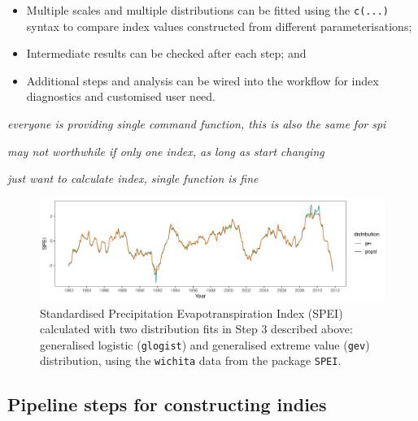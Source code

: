 \documentclass[
]{article}
\providecommand{\tightlist}{%
  \setlength{\itemsep}{0pt}\setlength{\parskip}{0pt}}\usepackage{longtable,booktabs,array}
\begin{document}
\begin{itemize}
\tightlist
\item
  Multiple scales and multiple distributions can be fitted using the
  \texttt{c(...)} syntax to compare index values constructed from
  different parameterisations;
\item
  Intermediate results can be checked after each step; and
\item
  Additional steps and analysis can be wired into the workflow for index
  diagnostics and customised user need.
\end{itemize}

\emph{everyone is providing single command function, this is also the
same for spi}

\emph{may not worthwhile if only one index, as long as start changing}

\emph{just want to calculate index, single function is fine}

\begin{figure}

{\centering \includegraphics[width=1\textwidth,height=0.3\textheight]{../figures/toy-example-spei.png}

}

\caption{\label{fig-toy-example}Standardised Precipitation
Evapotranspiration Index (SPEI) calculated with two distribution fits in
Step 3 described above: generalised logistic (\texttt{glogist}) and
generalised extreme value (\texttt{gev}) distribution, using the
\texttt{wichita} data from the package \texttt{SPEI}.}

\end{figure}

\newpage

\hypertarget{pipeline-steps-for-constructing-indies}{%
\subsection{Pipeline steps for constructing
indies}\label{pipeline-steps-for-constructing-indies}}
\end{document}
